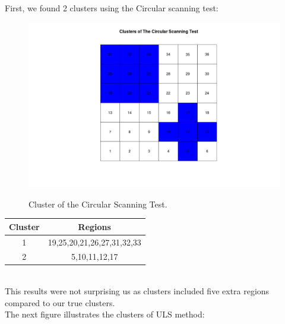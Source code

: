 \documentclass[12pt]{article}
\begin{document}
First, we found 2 clusters using the Circular scanning test:\\


\begin{figure}[!ht]
	
	\centering
	\includegraphics[scale=0.2]{Ex2_Circular}\\
	\caption{Cluster of the Circular Scanning Test.\label{f:gull}}
	
\end{figure}

\hspace{4cm}\begin{tabular}{|c|c|}
	\hline
	Cluster & Regions \\
	\hline
	1 & 19,25,20,21,26,27,31,32,33 \\
	2 & 5,10,11,12,17 \\ 
	 \hline
\end{tabular} \\

This results were not surprising us as clusters included five extra regions compared to our true clusters.\\
\newpage
The next figure illustrates the clusters of ULS method: \\ 
\end{document}
